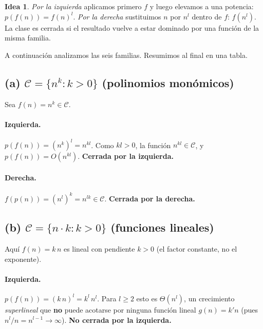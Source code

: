 \documentclass[11pt,a4paper]{article}
\theoremstyle{plain}
\theoremstyle{definition}
\newtheorem*{idea}{Idea}
\begin{document}
\begin{idea}
\emph{Por la izquierda} aplicamos primero $f$ y luego elevamos a una potencia:
$p(f(n))=f(n)^{l}$. \emph{Por la derecha} sustituimos $n$ por $n^{l}$ dentro de $f$:
$f(n^{l})$. La clase es cerrada si el resultado vuelve a estar dominado por una
funci\'on de la misma familia.
\end{idea}

A continuaci\'on analizamos las seis familias. Resumimos al final en una tabla.

\subsection*{(a) $\mathcal{C}=\{n^{k}: k>0\}$ (polinomios mon\'omicos)}

Sea $f(n)=n^{k}\in\mathcal{C}$.

\paragraph{Izquierda.} $p(f(n)) = (n^{k})^{l} = n^{kl}$. Como $kl>0$, la funci\'on
$n^{kl}\in\mathcal{C}$, y $p(f(n))=O(n^{kl})$. \textbf{Cerrada por la izquierda.}

\paragraph{Derecha.} $f(p(n)) = (n^{l})^{k} = n^{lk}\in\mathcal{C}$.
\textbf{Cerrada por la derecha.}

\medskip\noindent{}

\subsection*{(b) $\mathcal{C}=\{n\cdot k: k>0\}$ (funciones lineales)}

Aqu\'i $f(n)=k\,n$ es lineal con pendiente $k>0$ (el factor constante, no el
exponente).

\paragraph{Izquierda.} $p(f(n)) = (k\,n)^{l} = k^{l}\,n^{l}$. Para $l\geq 2$ esto es
$\Theta(n^{l})$, un crecimiento \emph{superlineal} que \textbf{no} puede acotarse por
ninguna funci\'on lineal $g(n)=k'n$ (pues $n^{l}/n=n^{l-1}\to\infty$). \textbf{No
cerrada por la izquierda.}
\end{document}
